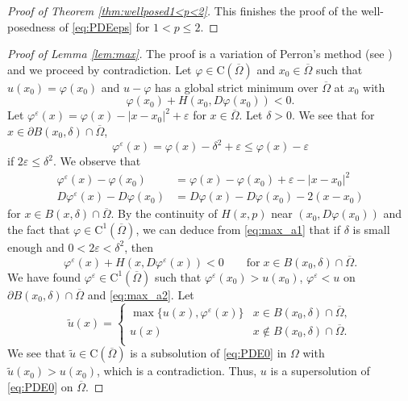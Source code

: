 \documentclass[12pt,reqno]{amsart}
\numberwithin{figure}{section}
\theoremstyle{plain}
\theoremstyle{remark}
\numberwithin{equation}{section}
\newcommand{\rmC}{\mathrm{C}}
\begin{document}
\begin{appendices}
\begin{proof} [Proof of Theorem \ref{thm:wellposed1<p<2}]
\noindent This finishes the proof of the well-posedness of \eqref{eq:PDEeps} for $1<p\leq2$. 
\end{proof}


\begin{proof}[Proof of Lemma \ref{lem:max}] The proof is a variation of Perron's method (see \cite{Capuzzo-Dolcetta1990}) and we proceed by contradiction. Let $\varphi\in \rmC(\overline{\Omega})$ and $x_0\in \overline{\Omega}$ such that $u(x_0) = \varphi(x_0)$ and $u-\varphi$ has a global strict minimum over $\overline{\Omega}$ at $x_0$ with 
\begin{equation}\label{eq:max_a1}
      \varphi(x_0) + H(x_0,D\varphi(x_0)) < 0.
\end{equation}
Let $\varphi^\varepsilon(x) = \varphi(x) - |x-x_0|^2 + \varepsilon$ for $x\in \overline{\Omega}$. Let $\delta > 0$. We see that for $x\in \partial B(x_0,\delta)\cap \overline{\Omega}$,
\begin{equation*}
    \varphi^\varepsilon(x) = \varphi(x) - \delta^2 +\varepsilon \leq \varphi(x) - \varepsilon
\end{equation*}
if $2\varepsilon \leq \delta^2$. We observe that
\begin{equation*}
    \begin{split}
    \varphi^\varepsilon(x) - \varphi(x_0)  &= \varphi(x)-\varphi(x_0) + \varepsilon - |x-x_0|^2 \\
    D\varphi^\varepsilon(x) - D\varphi(x_0) &= D\varphi(x) - D\varphi(x_0) - 2(x-x_0)
    \end{split}
\end{equation*}
for $x\in B(x,\delta)\cap \overline{\Omega}$. By the continuity of $H(x,p)$ near $(x_0,D\varphi(x_0))$ and the fact that $\varphi\in \rmC^1(\overline{\Omega})$, we can deduce from \eqref{eq:max_a1} that if $\delta$ is small enough and $0<2\varepsilon < \delta^2$, then
\begin{equation}\label{eq:max_a2}
      \varphi^\varepsilon(x)+H(x,D\varphi^\varepsilon(x)) < 0 \qquad\text{for}\;x\in B(x_0,\delta)\cap \overline{\Omega}.
\end{equation}
We have found $\varphi^\varepsilon\in \mathrm{C}^1(\overline{\Omega})$ such that $\varphi^\varepsilon(x_0)>u(x_0)$, $\varphi^\varepsilon<u$ on $\partial B(x_0,\delta)\cap \overline{\Omega}$ and \eqref{eq:max_a2}. Let
\begin{equation*}
    \tilde{u}(x) = \begin{cases}
    \max \big\lbrace u(x),\varphi^\varepsilon(x) \big\rbrace &x\in B(x_0,\delta)\cap \overline{\Omega},\\
    u(x)&x\notin B(x_0,\delta)\cap \overline{\Omega}.\\
    \end{cases}
\end{equation*}
We see that $\tilde{u}\in \rmC(\overline{\Omega})$ is a subsolution of \eqref{eq:PDE0} in $\Omega$ with $\tilde{u}(x_0) > u(x_0)$, which is a contradiction. Thus, $u$ is a supersolution of \eqref{eq:PDE0} on $\overline{\Omega}$.
\end{proof}



\end{appendices}
\end{document}
